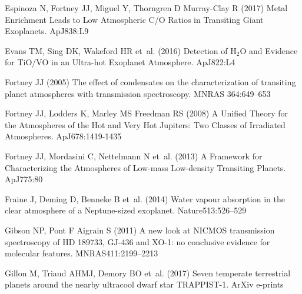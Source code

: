 \documentclass[graybox,natbib,nosecnum]{svmult}
\newcommand*\apj{ApJ}
\newcommand*\apjl{ApJ}
\newcommand*\mnras{MNRAS}
\newcommand*\nat{Nature}
\begin{document}
\begin{thebibliography}{110}
{Espinoza} N, {Fortney} JJ, {Miguel} Y, {Thorngren} D {Murray-Clay} R (2017)
  {Metal Enrichment Leads to Low Atmospheric C/O Ratios in Transiting Giant
  Exoplanets}. \apjl 838:L9

{Evans} TM, {Sing} DK, {Wakeford} HR et~al. (2016) {Detection of H$_{2}$O and
  Evidence for TiO/VO in an Ultra-hot Exoplanet Atmosphere}. \apjl 822:L4

{Fortney} JJ (2005) {The effect of condensates on the characterization of
  transiting planet atmospheres with transmission spectroscopy}. \mnras
  364:649--653

{Fortney} JJ, {Lodders} K, {Marley} MS {Freedman} RS (2008) {A Unified Theory
  for the Atmospheres of the Hot and Very Hot Jupiters: Two Classes of
  Irradiated Atmospheres}. \apj 678:1419-1435

{Fortney} JJ, {Mordasini} C, {Nettelmann} N et~al. (2013) {A Framework for
  Characterizing the Atmospheres of Low-mass Low-density Transiting Planets}.
  \apj 775:80

{Fraine} J, {Deming} D, {Benneke} B et~al. (2014) {Water vapour absorption in
  the clear atmosphere of a Neptune-sized exoplanet}. \nat 513:526--529

{Gibson} NP, {Pont} F {Aigrain} S (2011) {A new look at NICMOS transmission
  spectroscopy of HD 189733, GJ-436 and XO-1: no conclusive evidence for
  molecular features}. \mnras 411:2199--2213

{Gillon} M, {Triaud} AHMJ, {Demory} BO et~al. (2017) {Seven temperate
  terrestrial planets around the nearby ultracool dwarf star TRAPPIST-1}. ArXiv
  e-prints


\end{thebibliography}
\end{document}
